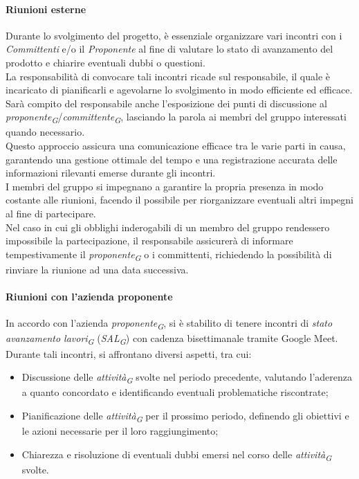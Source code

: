 \paragraph{Riunioni esterne}
Durante lo svolgimento del progetto, è essenziale organizzare vari incontri con i \textit{Committenti} e/o il \textit{Proponente} al fine di valutare lo stato di avanzamento del prodotto e chiarire eventuali dubbi o questioni. \\
La responsabilità di convocare tali incontri ricade sul responsabile, il quale è incaricato di pianificarli e agevolarne lo svolgimento in modo efficiente ed efficace. \\
Sarà compito del responsabile anche l'esposizione dei punti di discussione al \textit{proponente}\textsubscript{\textit{G}}/\textit{committente}\textsubscript{\textit{G}}, lasciando la parola ai membri del gruppo interessati quando necessario. \\
Questo approccio assicura una comunicazione efficace tra le varie parti in causa, garantendo una gestione ottimale del tempo e una registrazione accurata delle informazioni rilevanti emerse durante gli incontri.\\
I membri del gruppo si impegnano a garantire la propria presenza in modo costante alle riunioni, facendo il possibile per riorganizzare eventuali altri impegni al fine di partecipare. \\
Nel caso in cui gli obblighi inderogabili di un membro del gruppo rendessero impossibile la partecipazione, il responsabile assicurerà di informare tempestivamente il \textit{proponente}\textsubscript{\textit{G}} o i committenti, richiedendo la possibilità di rinviare la riunione ad una data successiva.

\paragraph*{Riunioni con l'azienda proponente}
In accordo con l'azienda \textit{proponente}\textsubscript{\textit{G}}, si è stabilito di tenere incontri di \textit{stato avanzamento lavori}\textsubscript{\textit{G}} (\textit{SAL}\textsubscript{\textit{G}}) con cadenza bisettimanale tramite Google Meet. \\
Durante tali incontri, si affrontano diversi aspetti, tra cui:
\begin{itemize}
    \item Discussione delle \textit{attività}\textsubscript{\textit{G}} svolte nel periodo precedente, valutando l'aderenza a quanto concordato e identificando eventuali problematiche riscontrate;
    \item Pianificazione delle \textit{attività}\textsubscript{\textit{G}} per il prossimo periodo, definendo gli obiettivi e le azioni necessarie per il loro raggiungimento;
    \item Chiarezza e risoluzione di eventuali dubbi emersi nel corso delle \textit{attività}\textsubscript{\textit{G}} svolte.
\end{itemize}

